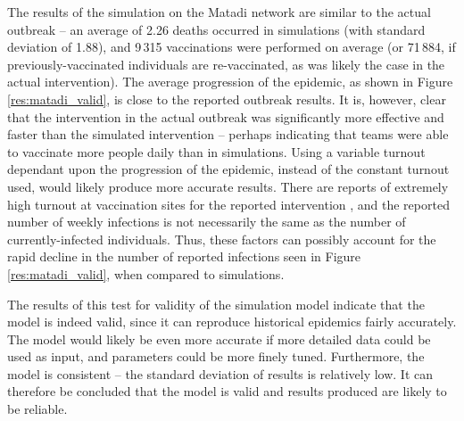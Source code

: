 The results of the simulation on the Matadi network are similar to the actual outbreak -- an average of 2.26 deaths occurred in simulations (with standard deviation of 1.88), and 9\,315 vaccinations were performed on average (or 71\,884, if previously-vaccinated individuals are re-vaccinated, as was likely the case in the actual intervention). The average progression of the epidemic, as shown in Figure \ref{res:matadi_valid}, is close to the reported outbreak results. It is, however, clear that the intervention in the actual outbreak was significantly more effective and faster than the simulated intervention -- perhaps indicating that teams were able to vaccinate more people daily than in simulations. Using a variable turnout dependant upon the progression of the epidemic, instead of the constant turnout used, would likely produce more accurate results. There are reports of extremely high turnout at vaccination sites for the reported intervention \cite{msf_2006}, and the reported number of weekly infections is not necessarily the same as the number of currently-infected individuals. Thus, these factors can possibly account for the rapid decline in the number of reported infections seen in Figure \ref{res:matadi_valid}, when compared to simulations.

The results of this test for validity of the simulation model indicate that the model is indeed valid, since it can reproduce historical epidemics fairly accurately. The model would likely be even more accurate if more detailed data could be used as input, and parameters could be more finely tuned. Furthermore, the model is consistent -- the standard deviation of results is relatively low. It can therefore be concluded that the model is valid and results produced are likely to be reliable.